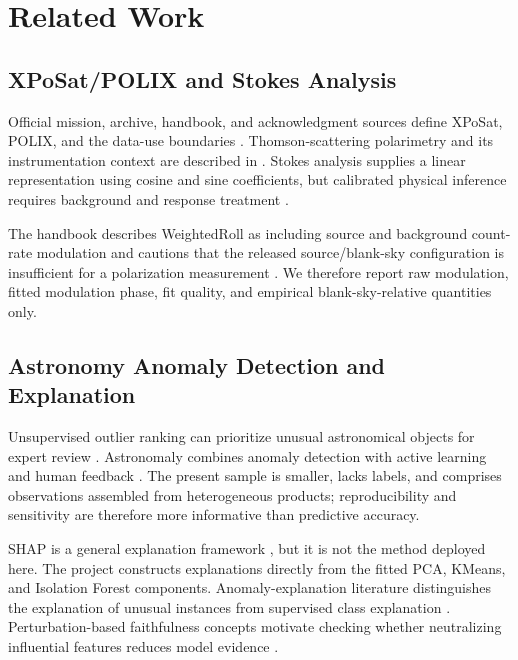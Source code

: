 \documentclass[conference]{IEEEtran}
\begin{document}
\section{Related Work}

\subsection{XPoSat/POLIX and Stokes Analysis}

Official mission, archive, handbook, and acknowledgment sources define XPoSat, POLIX, and the data-use boundaries \cite{isro_xposat_2023,polix_handbook_2025,pradan_xposat,xposat_ack}. Thomson-scattering polarimetry and its instrumentation context are described in \cite{rishin2010thomson,fabiani2018instrumentation}. Stokes analysis supplies a linear representation using cosine and sine coefficients, but calibrated physical inference requires background and response treatment \cite{kislat2015stokes}.

The handbook describes WeightedRoll as including source and background count-rate modulation and cautions that the released source/blank-sky configuration is insufficient for a polarization measurement \cite{polix_handbook_2025}. We therefore report raw modulation, fitted modulation phase, fit quality, and empirical blank-sky-relative quantities only.

\subsection{Astronomy Anomaly Detection and Explanation}

Unsupervised outlier ranking can prioritize unusual astronomical objects for expert review \cite{baron2017weirdest}. Astronomaly combines anomaly detection with active learning and human feedback \cite{lochner2021astronomaly}. The present sample is smaller, lacks labels, and comprises observations assembled from heterogeneous products; reproducibility and sensitivity are therefore more informative than predictive accuracy.

SHAP is a general explanation framework \cite{lundberg2017shap}, but it is not the method deployed here. The project constructs explanations directly from the fitted PCA, KMeans, and Isolation Forest components. Anomaly-explanation literature distinguishes the explanation of unusual instances from supervised class explanation \cite{yepmo2022anomaly}. Perturbation-based faithfulness concepts motivate checking whether neutralizing influential features reduces model evidence \cite{yeh2019infidelity}.
\end{document}
